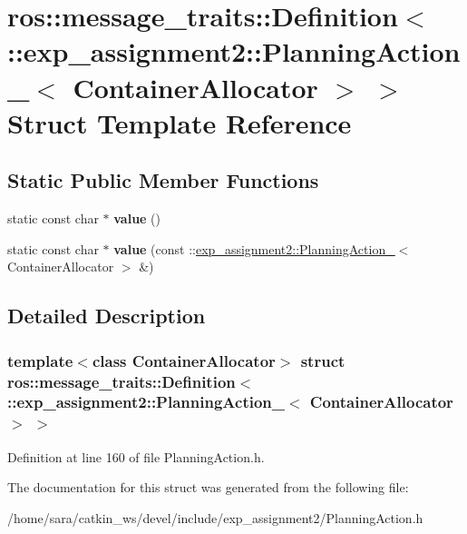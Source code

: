\hypertarget{structros_1_1message__traits_1_1Definition_3_01_1_1exp__assignment2_1_1PlanningAction___3_01ContainerAllocator_01_4_01_4}{}\section{ros\+:\+:message\+\_\+traits\+:\+:Definition$<$ \+:\+:exp\+\_\+assignment2\+:\+:Planning\+Action\+\_\+$<$ Container\+Allocator $>$ $>$ Struct Template Reference}
\label{structros_1_1message__traits_1_1Definition_3_01_1_1exp__assignment2_1_1PlanningAction___3_01ContainerAllocator_01_4_01_4}
\subsection*{Static Public Member Functions}
\begin{DoxyCompactItemize}
\item 
\mbox{\label{structros_1_1message__traits_1_1Definition_3_01_1_1exp__assignment2_1_1PlanningAction___3_01ContainerAllocator_01_4_01_4_ad845a7061c1dd9ac6b1421b1bfed4c21}} 
static const char $\ast$ {\bfseries value} ()
\item 
\mbox{\label{structros_1_1message__traits_1_1Definition_3_01_1_1exp__assignment2_1_1PlanningAction___3_01ContainerAllocator_01_4_01_4_a10012080900334903b0b717b359b1c48}} 
static const char $\ast$ {\bfseries value} (const \+::\hyperlink{structexp__assignment2_1_1PlanningAction__}{exp\+\_\+assignment2\+::\+Planning\+Action\+\_\+}$<$ Container\+Allocator $>$ \&)
\end{DoxyCompactItemize}


\subsection{Detailed Description}
\subsubsection*{template$<$class Container\+Allocator$>$\newline
struct ros\+::message\+\_\+traits\+::\+Definition$<$ \+::exp\+\_\+assignment2\+::\+Planning\+Action\+\_\+$<$ Container\+Allocator $>$ $>$}



Definition at line 160 of file Planning\+Action.\+h.



The documentation for this struct was generated from the following file\+:\begin{DoxyCompactItemize}
\item 
/home/sara/catkin\+\_\+ws/devel/include/exp\+\_\+assignment2/Planning\+Action.\+h\end{DoxyCompactItemize}
